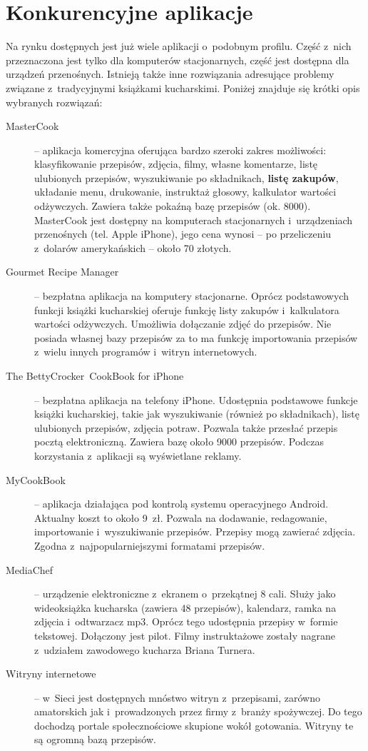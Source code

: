 \documentclass[12pt,leqno, twoside]{mwart}
\begin{document}
\section{Konkurencyjne aplikacje}
Na rynku dostępnych jest już wiele aplikacji o~podobnym profilu. Część z~nich przeznaczona jest tylko dla komputerów stacjonarnych, część jest dostępna dla urządzeń przenośnych. Istnieją także inne rozwiązania adresujące problemy związane z~tradycyjnymi książkami kucharskimi. Poniżej znajduje się krótki opis wybranych rozwiązań:
\begin{description}
  \item[MasterCook] -- aplikacja komercyjna oferująca bardzo szeroki zakres możliwości: klasyfikowanie przepisów, zdjęcia, filmy, własne komentarze, listę ulubionych przepisów, wyszukiwanie po składnikach, \textbf{listę zakupów}, układanie menu, drukowanie, instruktaż głosowy, kalkulator wartości odżywczych. Zawiera także pokaźną bazę przepisów (ok. 8000). Master\nolinebreak[4]Cook jest dostępny na komputerach stacjonarnych i~urządzeniach przenośnych (tel. Apple iPhone), jego cena wynosi -- po przeliczeniu z~dolarów amerykańskich -- około 70 złotych.
  \item[Gourmet Recipe Manager] -- bezpłatna aplikacja na komputery stacjonarne. Oprócz podstawowych funkcji książki kucharskiej oferuje funkcję listy zakupów i~kalkulatora wartości odżywczych. Umożliwia dołączanie zdjęć do przepisów. Nie posiada własnej bazy przepisów za to ma funkcję importowania przepisów z~wielu innych programów i~witryn internetowych.
  \item[The BettyCrocker\textregistered\ CookBook for iPhone] -- bezpłatna aplikacja na telefony iPhone. Udostępnia podstawowe funkcje książki kucharskiej, takie jak wyszukiwanie (również po składnikach), listę ulubionych przepisów, zdjęcia potraw. Pozwala także przesłać przepis pocztą elektroniczną. Zawiera bazę około 9000 przepisów. Podczas korzystania z~aplikacji są wyświetlane reklamy.
\vfill\pagebreak
  \item[MyCookBook] -- aplikacja działająca pod kontrolą systemu operacyjnego Android. Aktualny koszt to około 9~zł. Pozwala na dodawanie, redagowanie, importowanie i~wyszukiwanie przepisów. Przepisy mogą zawierać zdjęcia. Zgodna z~najpopularniejszymi formatami przepisów.
  \item[MediaChef\textregistered] -- urządzenie elektroniczne z~ekranem o~przekątnej 8 cali. Służy jako wideoksiążka kucharska (zawiera 48 przepisów), kalendarz, ramka na zdjęcia i~odtwarzacz mp3. Oprócz tego udostępnia przepisy w~formie tekstowej. Dołączony jest pilot. Filmy instruktażowe zostały nagrane z~udziałem zawodowego kucharza Briana Turnera.
  \item[Witryny internetowe] -- w~Sieci jest dostępnych mnóstwo witryn z~przepisami, zarówno amatorskich jak i~prowadzonych przez firmy z~branży spożywczej. Do tego dochodzą portale społecznościowe skupione wokół gotowania. Witryny te są ogromną bazą przepisów.
\end{description}
\end{document}
